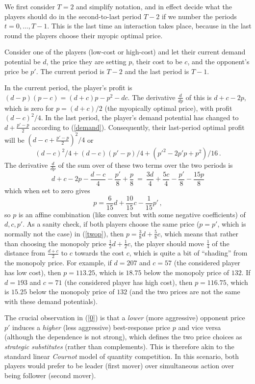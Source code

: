 \documentclass[a4paper,12pt]{article}  %
\theoremstyle{definition}
\begin{document}
We first consider $T=2$ and simplify notation, and in effect
decide what the players should do in the second-to-last
period $T-2$ if we number the periods $t=0,\ldots,T-1$.
This is the last time an interaction takes place, because in
the last round the players choose their myopic optimal
price.

Consider one of the players (low-cost or high-cost) and let
their current demand potential be $d$, the price they are
setting $p$, their cost to be $c$, and the opponent's price
be $p'$.
The current period is $T-2$ and the last period is $T-1$.

In the current period, the player's profit is
$(d-p)(p-c)=(d+c)p-p^2-dc$.
The derivative $\frac d{dp}$ of this is $d+c-2p$, which is
zero for $p=(d+c)/2$ (the myopically optimal price), with
profit $(d-c)^2/4$.
In the last period, the player's demand potential has
changed to $d+\frac{p'-p}2$ according to (\ref{demand}).
Consequently, their last-period optimal profit will be
$(d-c+\frac{p'-p}2)^2/4$ or
\[
(d-c)^2/4+(d-c){(p'-p)}/4+(p'^2-2p'p+p^2)/16\,.
\]
The derivative $\frac d{dp}$ of the sum over of these two
terms over the two periods is
\begin{equation}
\label{twop}
d+c-2p-\frac{d-c}4-\frac{p'}8+\frac{p}8
~=~ 
\frac{3d}4+ \frac{5c}4-\frac{p'}8-\frac{15p}8
\end{equation}
which when set to zero gives
\begin{equation}
\label{0}
p=\frac{6}{15}d+\frac{10}{15}c-\frac{1}{15}p'\,,
\end{equation}
so $p$ is an affine combination (like convex but with
some negative coefficients) of $d,c,p'$.
As a sanity check, if both players choose the same price
($p=p'$, which is normally not the case) in (\ref{twop}),
then $p=\frac38d+\frac58c$, which means that rather than
choosing the monopoly price $\frac12d+\frac12c$, the player
should move $\frac14$ of the distance from $\frac{d+c}2$ to
$c$ towards the cost $c$, which is quite a bit of
``shading'' from the monopoly price.
For example, if $d=207$ and $c=57$ (the considered player
has low cost), then $p=113.25$, which is $18.75$ below the
monopoly price of $132$.
If $d=193$ and $c=71$ (the considered player
has high cost), then $p=116.75$, which is $15.25$ below the
monopoly price of $132$ (and the two prices are not the same
with these demand potentials).

The crucial observation in (\ref{0}) is that a
\textit{lower} (more aggressive) opponent price $p'$
induces a \textit{higher} (less aggressive) best-response
price $p$ and vice versa (although the dependence is not
strong), which defines the two price choices as
\textit{strategic substitutes} (rather than complements).
This is therefore akin to the standard linear
\textit{Cournot} model of quantity competition.
In this scenario, both players would prefer to be
leader (first mover) over simultaneous action over being
follower (second mover).
\end{document}

